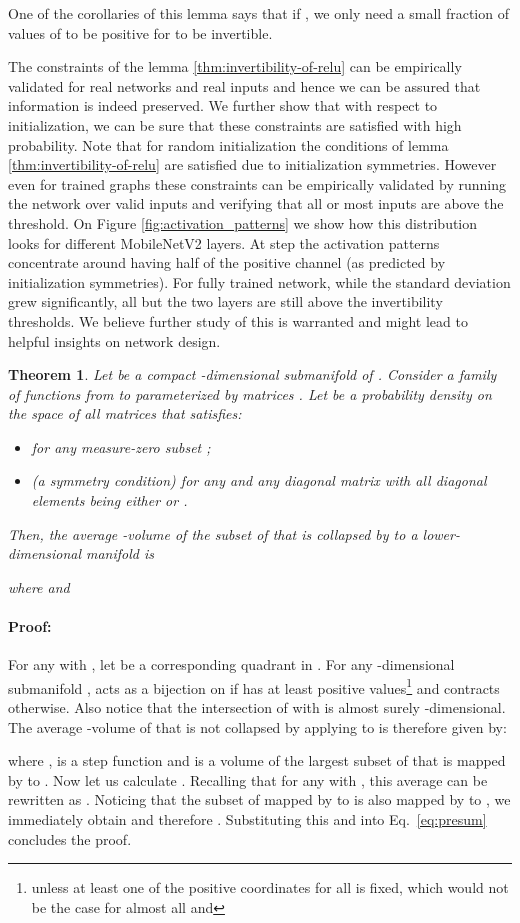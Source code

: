 \documentclass[10pt,twocolumn,letterpaper]{article}
\newenvironment{proof}{\paragraph{Proof:}}{}
\newtheorem{theorem}{Theorem}
\begin{document}
One of the corollaries of this lemma says that if , we only need a small fraction of values of  to be positive for  to be invertible.

The constraints of the lemma \ref{thm:invertibility-of-relu} can be empirically validated for real networks and real inputs and hence we can be assured that information is indeed preserved. We further show that with respect to initialization, we can be sure that these constraints are satisfied with high probability. Note that for random initialization the conditions of
lemma \ref{thm:invertibility-of-relu} are satisfied due
to initialization symmetries. However even for trained graphs these constraints can be empirically validated by running
the network over valid inputs and verifying that all or most inputs are above the threshold. On Figure \ref{fig:activation_patterns} we show how this distribution looks for  different MobileNetV2 layers. At step  the activation patterns concentrate around having half of the positive channel (as predicted by initialization symmetries). For fully trained network, while the standard deviation grew significantly, all but the two layers are still above the invertibility thresholds. We believe further study of this is warranted and might lead to helpful insights on network design.

\begin{theorem}
	Let  be a compact -dimensional submanifold of .
	Consider a family of functions  from  to  parameterized by  matrices .
	Let  be a probability density on the space of all matrices  that satisfies:
	\begin{itemize}
		\item  for any measure-zero subset ;
		\item (a symmetry condition)  for any  and any  diagonal matrix  with all diagonal elements being either  or .
	\end{itemize}
	Then, the average -volume of the subset of  that is collapsed by  to a lower-dimensional manifold is 
	
	where  and 
	
\end{theorem}
\begin{proof}
	For any  with , let  be a corresponding quadrant in .
	For any -dimensional submanifold ,  acts as a bijection on  if  has at least  positive values\footnote{unless at least one of the positive coordinates for all  is fixed, which would not be the case for almost all  and } and contracts  otherwise.
	Also notice that the intersection of  with  is almost surely -dimensional.
	The average -volume of  that is not collapsed by applying  to  is therefore given by:
	
	where ,  is a step function and  is a volume of the largest subset of  that is mapped by  to .
	Now let us calculate .
	Recalling that  for any  with , this average can be rewritten as .
	Noticing that the subset of  mapped by  to  is also mapped by  to , we immediately obtain  and therefore .
	Substituting this and  into Eq.~\ref{eq:presum} concludes the proof.
\end{proof}
\end{document}
